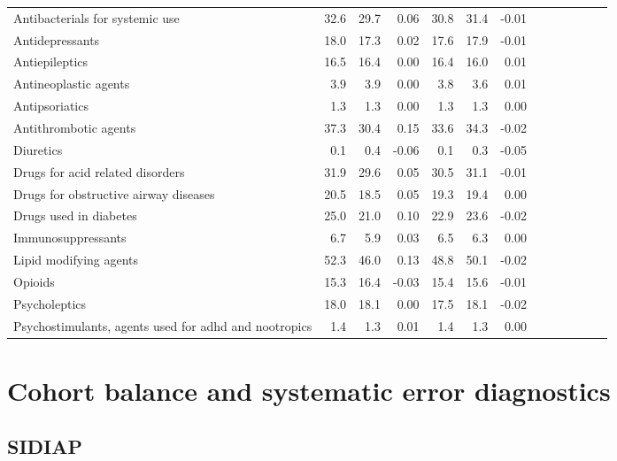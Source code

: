 \documentclass[11pt,]{article}
\begin{document}
\begin{longtable}{lrrrrrrrrrrrr}
      Antibacterials for systemic use & 32.6 & 29.7 &  0.06 & 30.8 & 31.4 & -0.01 \\ 
      Antidepressants & 18.0 & 17.3 &  0.02 & 17.6 & 17.9 & -0.01 \\ 
      Antiepileptics & 16.5 & 16.4 &  0.00 & 16.4 & 16.0 &  0.01 \\ 
      Antineoplastic agents &  3.9 &  3.9 &  0.00 &  3.8 &  3.6 &  0.01 \\ 
      Antipsoriatics &  1.3 &  1.3 &  0.00 &  1.3 &  1.3 &  0.00 \\ 
      Antithrombotic agents & 37.3 & 30.4 &  0.15 & 33.6 & 34.3 & -0.02 \\ 
      Diuretics &  0.1 &  0.4 & -0.06 &  0.1 &  0.3 & -0.05 \\ 
      Drugs for acid related disorders & 31.9 & 29.6 &  0.05 & 30.5 & 31.1 & -0.01 \\ 
      Drugs for obstructive airway diseases & 20.5 & 18.5 &  0.05 & 19.3 & 19.4 &  0.00 \\ 
      Drugs used in diabetes & 25.0 & 21.0 &  0.10 & 22.9 & 23.6 & -0.02 \\ 
      Immunosuppressants &  6.7 &  5.9 &  0.03 &  6.5 &  6.3 &  0.00 \\ 
      Lipid modifying agents & 52.3 & 46.0 &  0.13 & 48.8 & 50.1 & -0.02 \\ 
      Opioids & 15.3 & 16.4 & -0.03 & 15.4 & 15.6 & -0.01 \\ 
      Psycholeptics & 18.0 & 18.1 &  0.00 & 17.5 & 18.1 & -0.02 \\ 
      Psychostimulants, agents used for adhd and nootropics &  1.4 &  1.3 &  0.01 &  1.4 &  1.3 &  0.00 \\ 
   \bottomrule\end{longtable}
\clearpage

\hypertarget{cohort-balance-and-systematic-error-diagnostics}{%
\section{Cohort balance and systematic error
diagnostics}\label{cohort-balance-and-systematic-error-diagnostics}}

\hypertarget{sidiap-1}{%
\subsection{SIDIAP}\label{sidiap-1}}
\end{document}
